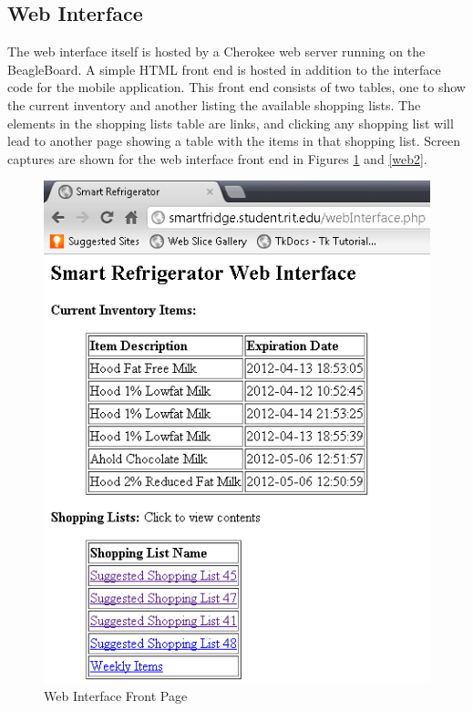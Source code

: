 \documentclass[11pt]{article} %
\begin{document}
\subsection{Web Interface}
The web interface itself is hosted by a Cherokee web server running on the BeagleBoard. A simple HTML front end is hosted in addition to the interface code for the mobile application. This front end consists of two tables, one to show the current inventory and another listing the available shopping lists. The elements in the shopping lists table are links, and clicking any shopping list will lead to another page showing a table with the items in that shopping list. Screen captures are shown for the web interface front end in Figures \ref{web1} and \ref{web2}.

\begin{figure}[h!]
\vspace{0.5cm}
\begin{center}
\includegraphics[scale=0.45]{../graphics/webInterfaceMain}
\caption{Web Interface Front Page}
\label{web1}
\end{center}
\end{figure}
\end{document}
